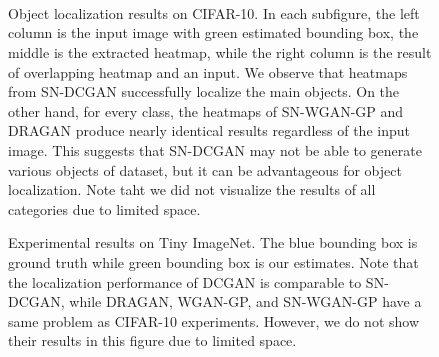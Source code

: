 \documentclass[runningheads]{llncs}
\begin{document}
\begin{figure}[t!]
    \noindent
    \begin{center}
        \\
        \\
        \\
    \end{center}
    \vspace*{-5mm}
    \caption{Object localization results on CIFAR-10. In each subfigure, the left column is the input image with green estimated bounding box, the middle is the extracted heatmap, while the right column is the result of overlapping heatmap and an input. We observe that heatmaps from SN-DCGAN successfully localize the main objects. On the other hand, for every class, the heatmaps of SN-WGAN-GP and DRAGAN produce nearly identical results regardless of the input image. This suggests that SN-DCGAN may not be able to generate various objects of dataset, but it can be advantageous for object localization. Note taht we did not visualize the results of all categories due to limited space.}
\label{fig:cifar10}
\vspace*{-5mm}
\end{figure}


\begin{figure}[h!]
    \noindent
    \begin{center}
        \vspace*{-1.5mm}
        \vspace*{-1.5mm}
        \vspace*{-1.5mm}
        \vspace*{-1.5mm}
        \vspace*{-1.5mm}
    \end{center}
    \vspace*{-5mm}
    \caption{Experimental results on Tiny ImageNet. The blue bounding box is ground truth while green bounding box is our estimates. Note that the localization performance of DCGAN is comparable to SN-DCGAN, while DRAGAN, WGAN-GP, and SN-WGAN-GP have a same problem as CIFAR-10 experiments. However, we do not show their results in this figure due to limited space.}
\label{fig:colocalization}
\vspace*{-5mm}
\end{figure}
\end{document}
